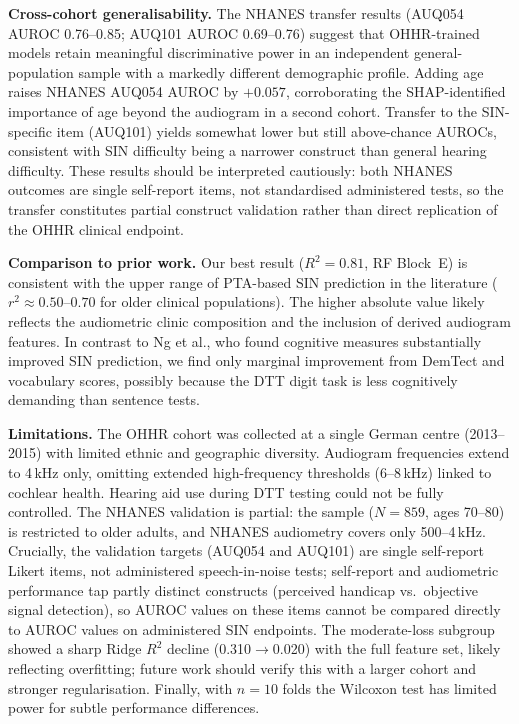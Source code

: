 \documentclass[12pt,a4paper]{article}
\begin{document}
\textbf{Cross-cohort generalisability.}  The NHANES transfer results
(AUQ054 AUROC 0.76--0.85; AUQ101 AUROC 0.69--0.76) suggest that OHHR-trained
models retain meaningful discriminative power in an independent
general-population sample with a markedly different demographic profile.
Adding age raises NHANES AUQ054 AUROC by $+0.057$, corroborating the
SHAP-identified importance of age beyond the audiogram in a second cohort.
Transfer to the SIN-specific item (AUQ101) yields somewhat lower but
still above-chance AUROCs, consistent with SIN difficulty being a narrower
construct than general hearing difficulty.  These results should be
interpreted cautiously: both NHANES outcomes are single self-report items, not
standardised administered tests, so the transfer constitutes partial construct
validation rather than direct replication of the OHHR clinical endpoint.

\textbf{Comparison to prior work.}  Our best result ($R^2=0.81$, RF
Block~E) is consistent with the upper range of PTA-based SIN prediction
in the literature ($r^2\approx0.50$--$0.70$ for older clinical
populations\cite{Smoorenburg1992}).  The higher absolute value likely reflects
the audiometric clinic composition and the inclusion of derived audiogram
features.  In contrast to Ng et al.\cite{Ng2015CognitionSIN}, who found
cognitive measures substantially improved SIN prediction, we find only
marginal improvement from DemTect and vocabulary scores, possibly because
the DTT digit task is less cognitively demanding than sentence tests.

\textbf{Limitations.}  The OHHR cohort was collected at a single German
centre (2013--2015) with limited ethnic and geographic diversity.  Audiogram
frequencies extend to 4\,kHz only, omitting extended high-frequency
thresholds (6--8\,kHz) linked to cochlear health\cite{Plack2014HiddenHL}.
Hearing aid use during DTT testing could not be fully controlled.  The NHANES
validation is partial: the sample ($N=859$, ages 70--80) is restricted to
older adults, and NHANES audiometry covers only 500--4\,kHz.  Crucially,
the validation targets (AUQ054 and AUQ101) are single self-report Likert
items, not administered speech-in-noise tests; self-report and audiometric
performance tap partly distinct constructs (perceived handicap vs.\ objective
signal detection), so AUROC values on these items cannot be compared directly
to AUROC values on administered SIN endpoints.  The moderate-loss
subgroup showed a sharp Ridge $R^2$ decline (0.310$\to$0.020) with the full
feature set, likely reflecting overfitting; future work should verify this
with a larger cohort and stronger regularisation.  Finally, with $n=10$ folds
the Wilcoxon test has limited power for subtle performance differences.
\end{document}
